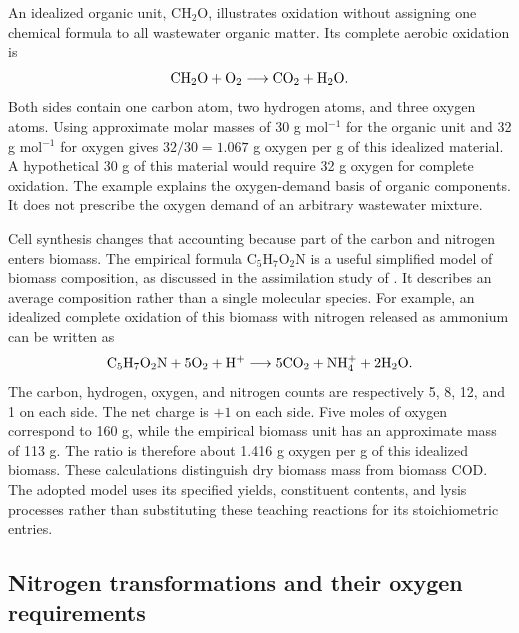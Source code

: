 An idealized organic unit, $\mathrm{CH_2O}$, illustrates oxidation without assigning one chemical formula to all wastewater organic matter. Its complete aerobic oxidation is
\begin{equation}
\equationname{Idealized aerobic oxidation of an organic unit}
\mathrm{CH_2O}+\mathrm{O_2}\longrightarrow\mathrm{CO_2}+\mathrm{H_2O}.
\label{eq:teaching_carbon_oxidation}
\end{equation}
Both sides contain one carbon atom, two hydrogen atoms, and three oxygen atoms. Using approximate molar masses of 30 g mol$^{-1}$ for the organic unit and 32 g mol$^{-1}$ for oxygen gives $32/30=1.067$ g oxygen per g of this idealized material. A hypothetical 30 g of this material would require 32 g oxygen for complete oxidation. The example explains the oxygen-demand basis of organic components. It does not prescribe the oxygen demand of an arbitrary wastewater mixture.

Cell synthesis changes that accounting because part of the carbon and nitrogen enters biomass. The empirical formula $\mathrm{C_5H_7O_2N}$ is a useful simplified model of biomass composition, as discussed in the assimilation study of \citet{Hoover1952}. It describes an average composition rather than a single molecular species. For example, an idealized complete oxidation of this biomass with nitrogen released as ammonium can be written as
\begin{equation}
\equationname{Idealized oxidation of biomass with ammonium release}
\mathrm{C_5H_7O_2N}+5\mathrm{O_2}+\mathrm{H^+}
\longrightarrow5\mathrm{CO_2}+\mathrm{NH_4^+}+2\mathrm{H_2O}.
\label{eq:teaching_biomass_oxidation}
\end{equation}
The carbon, hydrogen, oxygen, and nitrogen counts are respectively 5, 8, 12, and 1 on each side. The net charge is $+1$ on each side. Five moles of oxygen correspond to 160 g, while the empirical biomass unit has an approximate mass of 113 g. The ratio is therefore about 1.416 g oxygen per g of this idealized biomass. These calculations distinguish dry biomass mass from biomass COD. The adopted model uses its specified yields, constituent contents, and lysis processes rather than substituting these teaching reactions for its stoichiometric entries.

\subsection{Nitrogen transformations and their oxygen requirements}

